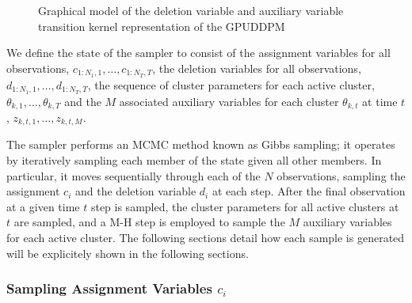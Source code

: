 \documentclass[smallcondensed, final]{svjour3}
\begin{document}
\begin{figure}[h]
        \caption{Graphical model of the deletion variable and auxiliary variable transition kernel representation of the GPUDDPM}
        \label{fig:gpuddpm_gm_2}
\end{figure}

We define the state of the sampler to consist of the assignment variables for all observations, $c_{1:N_{1},1}, \ldots, c_{1:N_{T}, T}$, the deletion variables for all observations, $d_{1:N_{1},1}, \ldots, d_{1:N_{T}, T}$, the sequence of cluster parameters for each active cluster, $\theta_{k,1}, \ldots, \theta_{k, T}$ and the $M$ associated auxiliary variables for each cluster $\theta_{k,t}$ at time $t$, $z_{k,t,1}, \ldots, z_{k, t, M}$.

The sampler performs an MCMC method known as Gibbs sampling; it operates by iteratively sampling each member of the state given all other members. In particular, it moves sequentially through each of the $N$ observations, sampling the assignment $c_{i}$ and the deletion variable $d_{i}$ at each step. After the final observation at a given time $t$ step is sampled, the cluster parameters for all active clusters at $t$ are sampled, and a M-H step is employed to sample the $M$ auxiliary variables for each active cluster. The following sections detail how each sample is generated will be explicitely shown in the following sections.





\subsubsection{Sampling Assignment Variables $c_{i}$}
\label{sec:sample_assignments}
\end{document}
